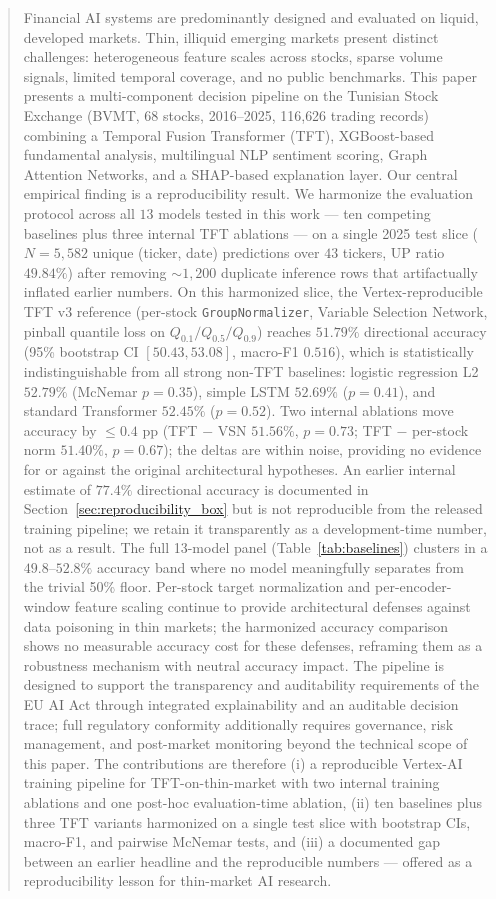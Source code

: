 \documentclass[conference]{IEEEtran}
\begin{document}
\begin{abstract}
Financial AI systems are predominantly designed and evaluated on liquid, developed markets. Thin, illiquid emerging markets present distinct challenges: heterogeneous feature scales across stocks, sparse volume signals, limited temporal coverage, and no public benchmarks. This paper presents a multi-component decision pipeline on the Tunisian Stock Exchange (BVMT, 68 stocks, 2016--2025, 116{,}626 trading records) combining a Temporal Fusion Transformer (TFT), XGBoost-based fundamental analysis, multilingual NLP sentiment scoring, Graph Attention Networks, and a SHAP-based explanation layer. Our central empirical finding is a reproducibility result. We harmonize the evaluation protocol across all $13$ models tested in this work --- ten competing baselines plus three internal TFT ablations --- on a single 2025 test slice ($N=5{,}582$ unique (ticker, date) predictions over $43$ tickers, UP ratio $49.84\%$) after removing $\sim 1{,}200$ duplicate inference rows that artifactually inflated earlier numbers. On this harmonized slice, the Vertex-reproducible TFT v3 reference (per-stock \texttt{GroupNormalizer}, Variable Selection Network, pinball quantile loss on $Q_{0.1}/Q_{0.5}/Q_{0.9}$) reaches $51.79\%$ directional accuracy (95\% bootstrap CI $[50.43, 53.08]$, macro-F1 $0.516$), which is statistically indistinguishable from all strong non-TFT baselines: logistic regression L2 $52.79\%$ (McNemar $p = 0.35$), simple LSTM $52.69\%$ ($p = 0.41$), and standard Transformer $52.45\%$ ($p = 0.52$). Two internal ablations move accuracy by $\leq 0.4$ pp (TFT $-$ VSN $51.56\%$, $p = 0.73$; TFT $-$ per-stock norm $51.40\%$, $p = 0.67$); the deltas are within noise, providing no evidence for or against the original architectural hypotheses. An earlier internal estimate of $77.4\%$ directional accuracy is documented in Section~\ref{sec:reproducibility_box} but is not reproducible from the released training pipeline; we retain it transparently as a development-time number, not as a result. The full 13-model panel (Table~\ref{tab:baselines}) clusters in a $49.8$--$52.8\%$ accuracy band where no model meaningfully separates from the trivial 50\% floor. Per-stock target normalization and per-encoder-window feature scaling continue to provide architectural defenses against data poisoning in thin markets; the harmonized accuracy comparison shows no measurable accuracy cost for these defenses, reframing them as a robustness mechanism with neutral accuracy impact. The pipeline is designed to support the transparency and auditability requirements of the EU AI Act through integrated explainability and an auditable decision trace; full regulatory conformity additionally requires governance, risk management, and post-market monitoring beyond the technical scope of this paper. The contributions are therefore (i) a reproducible Vertex-AI training pipeline for TFT-on-thin-market with two internal training ablations and one post-hoc evaluation-time ablation, (ii) ten baselines plus three TFT variants harmonized on a single test slice with bootstrap CIs, macro-F1, and pairwise McNemar tests, and (iii) a documented gap between an earlier headline and the reproducible numbers --- offered as a reproducibility lesson for thin-market AI research.

\end{abstract}
\end{document}
